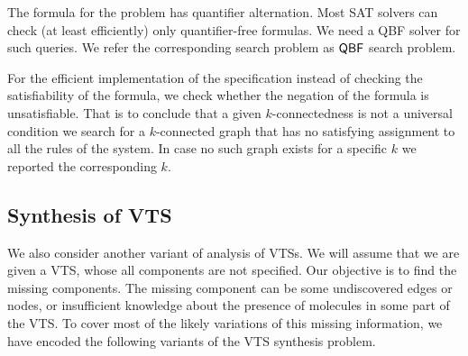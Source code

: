 %
 
The formula for the problem has quantifier alternation. 
%
Most SAT solvers can check (at least efficiently) only quantifier-free formulas.
%
%
We need a QBF solver for such queries. 
%
We refer the corresponding search problem as $\mathsf{QBF}$ search problem.
%

For the efficient implementation of the specification instead of checking the satisfiability of the formula, we check whether the negation of the formula is unsatisfiable. 
%
That is to conclude that a given $k$-connectedness is not a universal condition we search for a $k$-connected graph that has no satisfying assignment to all the rules of the system.
%
In case no such graph exists for a specific $k$ we reported the corresponding $k$.

%

\subsection{Synthesis of VTS}
%
\noindent We also consider another variant of analysis of VTSs.
%
We will assume that we are given a VTS, whose all components
are not specified.
%
Our objective is to find the missing components.
%
The missing component can
%
be some undiscovered edges or nodes, or insufficient
knowledge about the presence of molecules in some part of the VTS.
%
To cover most of the likely variations of this missing information,
we have encoded the following variants of the VTS synthesis problem.

